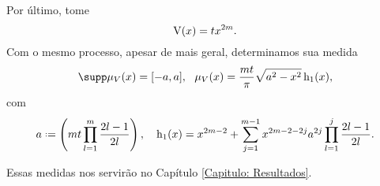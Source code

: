  
 Por último, tome $$\operatorname{V}(x) = t x^{2m}.$$ Com o mesmo processo, apesar de mais geral, determinamos sua medida 
 \begin{equation}
 	\supp \mu_V(x) = [-a, a], \ \ \mu_V(x) = \frac{mt}{\pi} \sqrt{a^2 - x^2} \h(x),
 	\label{Equação: Mônico}
 \end{equation}
com $$ a \deff \left( mt \prod_{l=1}^{m} \frac{2l-1}{2l}\right), \ \ \ \h(x) = x^{2m-2} + \sum_{j=1}^{m-1} x^{2m-2-2j} a^{2j} \prod_{l=1}^{j} \frac{2l-1}{2l}.$$

Essas medidas nos servirão no Capítulo \ref{Capitulo: Resultados}.

